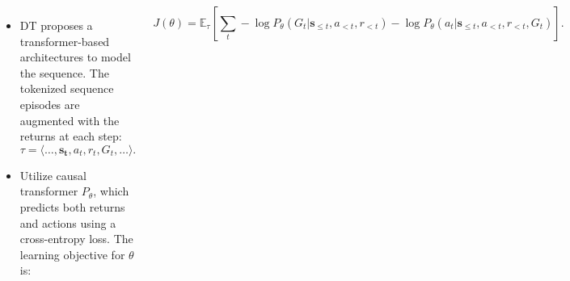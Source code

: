 \documentclass[20pt,margin=0.75in,innermargin=-4.5in,blockverticalspace=-0.35in]{tikzposter}
\begin{document}
\begin{columns}
{\begin{itemize}
    \item DT proposes a transformer-based architectures to model the sequence. The tokenized sequence episodes are augmented with the returns at each step:
    \begin{equation}
    \tau = \langle \dots, \mathbf{s_t}, a_t, r_t, G_t,  \dots \rangle.
\end{equation}
\item Utilize causal transformer $P_\theta$, which predicts both returns and actions using a cross-entropy loss.  The learning objective for ${\theta}$ is:
\end{itemize}
\begin{equation}
\label{dtloss}
    J(\theta) = \mathbb{E}_{\tau} \left[\sum_{t} -\log P_\theta(G_t | \mathbf{s}_{\le t},a_{<t},r_{<t}) - \log P_\theta(a_t | \mathbf{s}_{\le t},a_{<t},r_{<t},G_{t}) \right].    
\end{equation}
\vspace{4mm}

    }



\end{columns}
\end{document}
